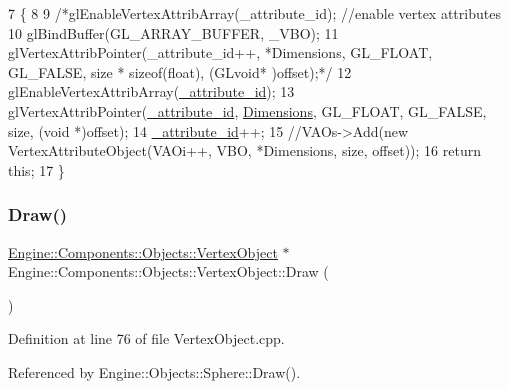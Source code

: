 \begin{DoxyCode}
7 \{
8 
9     \textcolor{comment}{/*glEnableVertexAttribArray(\_attribute\_id); //enable vertex attributes}
10 \textcolor{comment}{    glBindBuffer(GL\_ARRAY\_BUFFER, \_VBO);}
11 \textcolor{comment}{    glVertexAttribPointer(\_attribute\_id++, *Dimensions, GL\_FLOAT, GL\_FALSE, size * sizeof(float), (GLvoid*
      )offset);*/}
12     glEnableVertexAttribArray(\mbox{\hyperlink{classEngine_1_1Components_1_1Objects_1_1VertexObject_a401aa1eb0254e57d8295c2287749eed5}{\_attribute\_id}});
13     glVertexAttribPointer(\mbox{\hyperlink{classEngine_1_1Components_1_1Objects_1_1VertexObject_a401aa1eb0254e57d8295c2287749eed5}{\_attribute\_id}}, \mbox{\hyperlink{classEngine_1_1Components_1_1Objects_1_1VertexObject_ae5bb104a878dc8a3c909ec9b0ee799c1}{Dimensions}}, GL\_FLOAT, GL\_FALSE, size, (\textcolor{keywordtype}{void}
      *)offset);
14     \mbox{\hyperlink{classEngine_1_1Components_1_1Objects_1_1VertexObject_a401aa1eb0254e57d8295c2287749eed5}{\_attribute\_id}}++;
15     \textcolor{comment}{//VAOs->Add(new VertexAttributeObject(VAOi++, VBO, *Dimensions, size, offset));}
16     \textcolor{keywordflow}{return} \textcolor{keyword}{this};
17 \}
\end{DoxyCode}
\mbox{\label{classEngine_1_1Components_1_1Objects_1_1VertexObject_a53a8f546ee082720579e2c33be6cedec}} 
\subsubsection{\texorpdfstring{Draw()}{Draw()}}
{\footnotesize\ttfamily \mbox{\hyperlink{classEngine_1_1Components_1_1Objects_1_1VertexObject}{Engine\+::\+Components\+::\+Objects\+::\+Vertex\+Object}} $\ast$ Engine\+::\+Components\+::\+Objects\+::\+Vertex\+Object\+::\+Draw (\begin{DoxyParamCaption}{ }\end{DoxyParamCaption})}



Definition at line 76 of file Vertex\+Object.\+cpp.



Referenced by Engine\+::\+Objects\+::\+Sphere\+::\+Draw().


